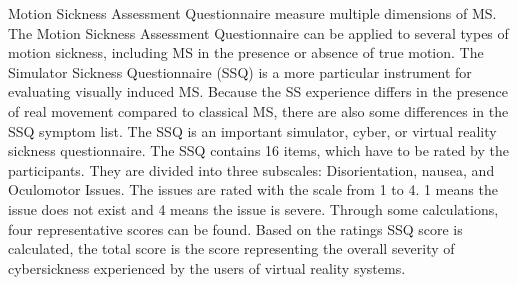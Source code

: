 Motion Sickness Assessment Questionnaire measure multiple dimensions of MS. The Motion Sickness Assessment Questionnaire can be applied to several types of motion sickness, including MS in the presence or absence of true motion. The Simulator Sickness Questionnaire (SSQ) is a more particular instrument for evaluating visually induced MS. Because the SS experience differs in the presence of real movement compared to classical MS, there are also some differences in the SSQ symptom list.
The SSQ is an important simulator, cyber, or virtual reality sickness questionnaire.
The SSQ contains 16 items, which have to be rated by the participants. They are divided into three subscales: Disorientation, nausea, and Oculomotor Issues. 
The issues are rated with the scale from 1 to 4. 1 means the issue does not exist and 4 means the issue is severe. Through some calculations, four representative scores can be found. Based on the ratings SSQ score is calculated, the total score is the score representing the overall severity of cybersickness experienced by the users of virtual reality systems.\cite{kennedy1993simulator}


